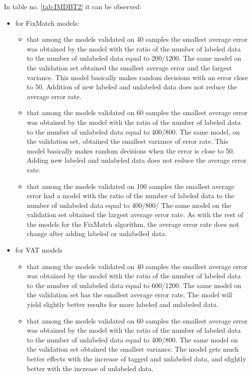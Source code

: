 \documentclass[12pt]{article}
\theoremstyle{definition}
\DeclareRobustCommand{\[}{\begin{equation}}
\DeclareRobustCommand{\]}{\end{equation}}
\begin{document}
\vspace{5mm} %
\vspace{5mm} %
In table no. \ref{tab:IMDBT2} it can be observed:
\begin{itemize}
    \item for FixMatch models:
    \begin{itemize}
        \item that among the models validated on 40 samples the smallest average error was obtained by the model with the ratio of the number of labeled data to the number of unlabeled data equal to 200/1200. The same model on the validation set obtained the smallest average error and the largest variance. This model basically makes random decisions with an error close to 50. Addition of new labeled and unlabeled data does not reduce the average error rate. 
         \item that among the models validated on 60 samples the smallest average error was obtained by the model with the ratio of the number of labeled data to the number of unlabeled data  equal to 400/800. The same model, on the validation set, obtained the smallest variance of error rate. This model basically makes random decisions when the error is close to 50.
         Adding new labeled and unlabeled data does not reduce the average error rate.  
        \item that among the models validated on 100 samples the smallest average error had a model with the ratio of the number of labeled data to the number of unlabeled data equal to 400/800/ The same model on the validation set obtained the largest average error rate.  As with the rest of the models for the FixMatch algorithm, the average error rate does not change after adding labeled or unlabelled data.  
    \end{itemize}
    \item for VAT models
    \begin{itemize}
        \item that among the models validated on 40 samples the smallest average error was obtained by the model with the ratio of the number of labeled data to the number of unlabeled data equal to 600/1200. The same model on the validation set has the smallest average error rate. The model will yield slightly better results for more labeled and unlabeled data.
        \item that among the models validated on 60 samples the smallest average error was obtained by the model with the ratio of the number of labeled data to the number of unlabeled data equal to 400/800. The same model on the validation set obtained the smallest variance. The model gets much better effects with the increase of tagged and unlabeled data, and slightly better with the increase of unlabeled data.

\end{itemize}
\end{itemize}
\end{document}
